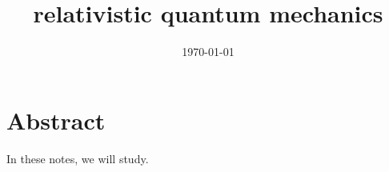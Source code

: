 \documentclass[a4paper, 12pt]{memoir}
\title{relativistic quantum mechanics}
\date{\today}
\begin{document}
\frontmatter



\tableofcontents

\mainmatter



\chapter*{Abstract}

    In these notes, we will study.
    




\backmatter

\nocite{rqmlecture2}

\clearpage
{}
\printbibliography
\end{document}
